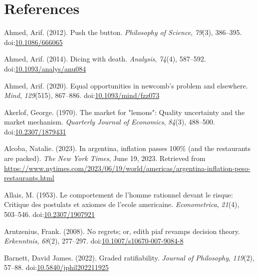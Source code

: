 \documentclass[
  12pt,
  letterpaper,
  DIV=11,
  numbers=noendperiod]{scrreprt}
\newlength{\cslhangindent}
\newenvironment{CSLReferences}[2] %
 {\begin{list}{}{%
  \setlength{\itemindent}{0pt}
  \setlength{\leftmargin}{0pt}
  \setlength{\parsep}{0pt}
  \ifodd #1
   \setlength{\leftmargin}{\cslhangindent}
   \setlength{\itemindent}{-1\cslhangindent}
  \fi
  \setlength{\itemsep}{#2\baselineskip}}}
 {\end{list}}
\begin{document}

\chapter*{References}\label{references}


\label{refs}
\begin{CSLReferences}{1}{0}
Ahmed, Arif. (2012). Push the button. \emph{Philosophy of Science},
\emph{79}(3), 386--395.
doi:\href{https://doi.org/10.1086/666065}{10.1086/666065}

Ahmed, Arif. (2014). Dicing with death. \emph{Analysis}, \emph{74}(4),
587--592.
doi:\href{https://doi.org/10.1093/analys/anu084}{10.1093/analys/anu084}

Ahmed, Arif. (2020). Equal opportunities in newcomb's problem and
elsewhere. \emph{Mind}, \emph{129}(515), 867--886.
doi:\href{https://doi.org/10.1093/mind/fzz073}{10.1093/mind/fzz073}

Akerlof, George. (1970). The market for "lemons": Quality uncertainty
and the market mechanism. \emph{Quarterly Journal of Economics},
\emph{84}(3), 488--500.
doi:\href{https://doi.org/10.2307/1879431}{10.2307/1879431}

Alcoba, Natalie. (2023). In argentina, inflation passes 100\% (and the
restaurants are packed). \emph{The New York Times}, June 19, 2023.
Retrieved from
\url{https://www.nytimes.com/2023/06/19/world/americas/argentina-inflation-peso-restaurants.html}

Allais, M. (1953). Le comportement de l'homme rationnel devant le
risque: Critique des postulats et axiomes de l'ecole americaine.
\emph{Econometrica}, \emph{21}(4), 503--546.
doi:\href{https://doi.org/10.2307/1907921}{10.2307/1907921}

Arntzenius, Frank. (2008). No regrets; or, edith piaf revamps decision
theory. \emph{Erkenntnis}, \emph{68}(2), 277--297.
doi:\href{https://doi.org/10.1007/s10670-007-9084-8}{10.1007/s10670-007-9084-8}

Barnett, David James. (2022). Graded ratifiability. \emph{Journal of
Philosophy}, \emph{119}(2), 57--88.
doi:\href{https://doi.org/10.5840/jphil202211925}{10.5840/jphil202211925}


\end{CSLReferences}
\end{document}
